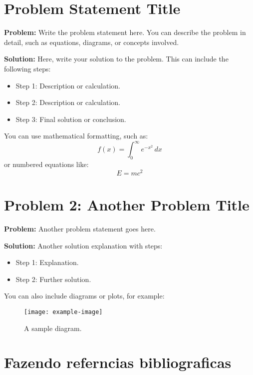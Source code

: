 
\section{Problem Statement Title}
\textbf{Problem:} Write the problem statement here. You can describe the problem in detail, such as equations, diagrams, or concepts involved.

\vspace{1em} %

\textbf{Solution:} Here, write your solution to the problem. This can include the following steps:
\begin{itemize}
    \item Step 1: Description or calculation.
    \item Step 2: Description or calculation.
    \item Step 3: Final solution or conclusion.
\end{itemize}

You can use mathematical formatting, such as:
\[
f(x) = \int_{0}^{\infty} e^{-x^2} \, dx
\]
or numbered equations like:
\begin{equation}
    E = mc^2
\end{equation}

\newpage

\section*{Problem 2: Another Problem Title}
\textbf{Problem:} Another problem statement goes here.

\vspace{1em}

\textbf{Solution:} Another solution explanation with steps:
\begin{itemize}
    \item Step 1: Explanation.
    \item Step 2: Further solution.
\end{itemize}

You can also include diagrams or plots, for example:
\begin{figure}[h]
    \centering
    \texttt{[image: example-image]} %
    \caption{A sample diagram.}
    \label{fig:sample-diagram}
\end{figure}

\newpage

\section{Fazendo referncias bibliograficas}

